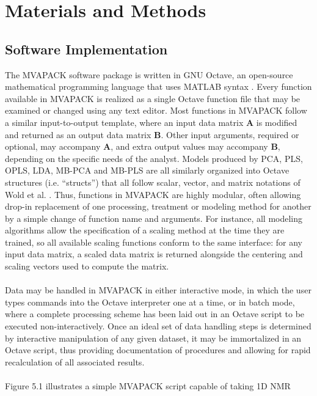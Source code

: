 \section{Materials and Methods}

\subsection{Software Implementation}

\begin{doublespace}
The MVAPACK software package is written in GNU Octave, an open-source
mathematical programming language that uses MATLAB syntax \cite{eaton2008}.
Every function available in MVAPACK is realized as a single Octave function
file that may be examined or changed using any text editor. Most functions in
MVAPACK follow a similar input-to-output template, where an input data matrix
$\mathbf{A}$ is modified and returned as an output data matrix $\mathbf{B}$.
Other input arguments, required or optional, may accompany $\mathbf{A}$, and
extra output values may accompany $\mathbf{B}$, depending on the specific
needs of the analyst. Models produced by PCA, PLS, OPLS, LDA, MB-PCA and
MB-PLS are all similarly organized into Octave structures (i.e. ``structs'')
that all follow scalar, vector, and matrix notations of Wold et al.
\cite{wold:cils2001}. Thus, functions in MVAPACK are highly modular, often
allowing drop-in replacement of one processing, treatment or modeling method
for another by a simple change of function name and arguments. For instance,
all modeling algorithms allow the specification of a scaling method at the
time they are trained, so all available scaling functions conform to the
same interface: for any input data matrix, a scaled data matrix is returned
alongside the centering and scaling vectors used to compute the matrix.
\\\\
Data may be handled in MVAPACK in either interactive mode, in which the user
types commands into the Octave interpreter one at a time, or in batch mode,
where a complete processing scheme has been laid out in an Octave script to
be executed non-interactively. Once an ideal set of data handling steps is
determined by interactive manipulation of any given dataset, it may be
immortalized in an Octave script, thus providing documentation of procedures
and allowing for rapid recalculation of all associated results.
\\\\
Figure 5.1 illustrates a simple MVAPACK script capable of taking 1D \hnmr{} NMR

\end{doublespace}
